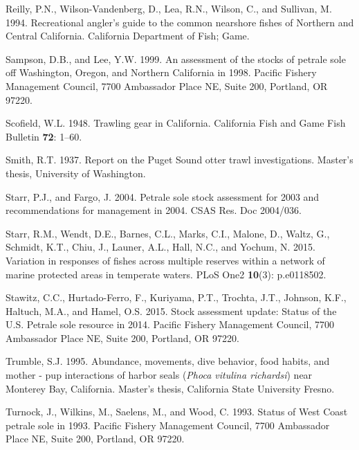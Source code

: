 \documentclass[11pt,
  english,
  letterpaper,
]{article}
\newlength{\cslhangindent}
\newenvironment{CSLReferences}[2] %
 {%
  \setlength{\parindent}{0pt}
  \ifodd #1 \everypar{\setlength{\hangindent}{\cslhangindent}}\ignorespaces\fi
  \ifnum #2 > 0
  \setlength{\parskip}{#2\baselineskip}
  \fi
 }%
 {}
\begin{document}
\begin{CSLReferences}{1}{0}
\leavevmode{}%
Reilly, P.N., Wilson-Vandenberg, D., Lea, R.N., Wilson, C., and Sullivan, M. 1994. Recreational angler's guide to the common nearshore fishes of {Northern} and {Central} {California}. California Department of Fish; Game.

\leavevmode{}%
Sampson, D.B., and Lee, Y.W. 1999. An assessment of the stocks of petrale sole off {Washington}, {Oregon}, and {Northern} {California} in 1998. Pacific Fishery Management Council, 7700 Ambassador Place NE, Suite 200, Portland, OR 97220.

\leavevmode{}%
Scofield, W.L. 1948. Trawling gear in {California}. California Fish and Game Fish Bulletin \textbf{72}: 1--60.

\leavevmode{}%
Smith, R.T. 1937. Report on the {Puget} {Sound} otter trawl investigations. Master's thesis, University of Washington.

\leavevmode{}%
Starr, P.J., and Fargo, J. 2004. Petrale sole stock assessment for 2003 and recommendations for management in 2004. CSAS Res. Doc 2004/036.

\leavevmode{}%
Starr, R.M., Wendt, D.E., Barnes, C.L., Marks, C.I., Malone, D., Waltz, G., Schmidt, K.T., Chiu, J., Launer, A.L., Hall, N.C., and Yochum, N. 2015. Variation in responses of fishes across multiple reserves within a network of marine protected areas in temperate waters. PLoS One2 \textbf{10}(3): p.e0118502.

\leavevmode{}%
Stawitz, C.C., Hurtado-Ferro, F., Kuriyama, P.T., Trochta, J.T., Johnson, K.F., Haltuch, M.A., and Hamel, O.S. 2015. Stock assessment update: {Status} of the {U}.{S}. Petrale sole resource in 2014. Pacific Fishery Management Council, 7700 Ambassador Place NE, Suite 200, Portland, OR 97220.

\leavevmode{}%
Trumble, S.J. 1995. Abundance, movements, dive behavior, food habits, and mother - pup interactions of harbor seals (\emph{{Phoca} vitulina richardsi}) near {Monterey} {Bay}, {California}. Master's thesis, California State University Fresno.

\leavevmode{}%
Turnock, J., Wilkins, M., Saelens, M., and Wood, C. 1993. Status of {West} {Coast} petrale sole in 1993. Pacific Fishery Management Council, 7700 Ambassador Place NE, Suite 200, Portland, OR 97220.


\end{CSLReferences}
\end{document}
